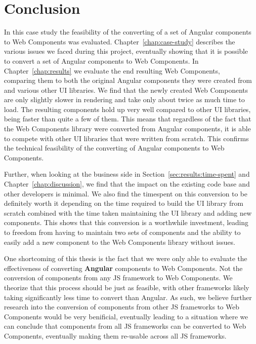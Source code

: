 \chapter{Conclusion}

In this case study the feasibility of the converting of a set of Angular components to Web Components was evaluated. Chapter~\ref{chap:case-study} describes the various issues we faced during this project, eventually showing that it is possible to convert a set of Angular components to Web Components. In Chapter~\ref{chap:results} we evaluate the end resulting Web Components, comparing them to both the original Angular components they were created from and various other UI libraries. We find that the newly created Web Components are only slightly slower in rendering and take only about twice as much time to load. The resulting components hold up very well compared to other UI libraries, being faster than quite a few of them. This means that regardless of the fact that the Web Components library were converted from Angular components, it is able to compete with other UI libraries that were written from scratch. This confirms the technical feasibility of the converting of Angular components to Web Components.

Further, when looking at the business side in Section~\ref{sec:results:time-spent} and Chapter~\ref{chap:discussion}, we find that the impact on the existing code base and other developers is minimal. We also find the timespent on this conversion to be definitely worth it depending on the time required to build the UI library from scratch combined with the time taken maintaining the UI library and adding new components. This shows that this conversion is a worthwhile investment, leading to freedom from having to maintain two sets of components and the ability to easily add a new component to the Web Components library without issues.

One shortcoming of this thesis is the fact that we were only able to evaluate the effectiveness of converting \textbf{Angular} components to Web Components. Not the conversion of components from any JS framework to Web Components. We theorize that this process should be just as feasible, with other frameworks likely taking significantly less time to convert than Angular. As such, we believe further research into the conversion of components from other JS frameworks to Web Components would be very benificial, eventually leading to a situation where we can conclude that components from all JS frameworks can be converted to Web Components, eventually making them re-usable across all JS frameworks.
